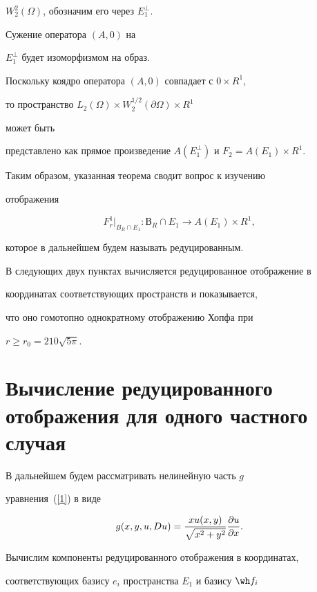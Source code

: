 $W^2_2(\Omega)$, обозначим его через $E_1^\perp$.


Сужение оператора $(A,0)$ на


$E_1^\perp $ будет изоморфизмом на образ.


Поскольку коядро оператора $(A,0)$ совпадает с $0\times R^1$,


то пространство $L_2(\Omega)\times W^{1/2}_2(\partial \Omega)\times R^1$


может быть


представлено как прямое произведение $A(E_1^\perp)$ и $F_2=A(E_1)\times R^1$.


Таким образом, указанная теорема сводит вопрос к изучению 


отображения


$$


F^1_r|_{B_R\cap E_1}: В_R\cap E_1\to A(E_1)\times R^1,


$$


которое в дальнейшем будем называть редуцированным.





В следующих двух пунктах вычисляется редуцированное отображение в 


координатах соответствующих пространств и показывается,


что оно гомотопно однократному отображению Хопфа при


$r\ge r_0=210\sqrt{5\pi }$.





\section{Вычисление редуцированного отображения для одного частного случая}





В дальнейшем будем рассматривать нелинейную часть $g$


уравнения~(\ref{1}) в виде


$$


g(x,y,u,Du)=\frac{xu(x,y)}{\sqrt{x^2+y^2}}\fr{u}{x}.


$$





Вычислим компоненты редуцированного отображения в координатах,


соответствующих базису $e_i$ пространства $E_1$ и базису $\wh f_i$


